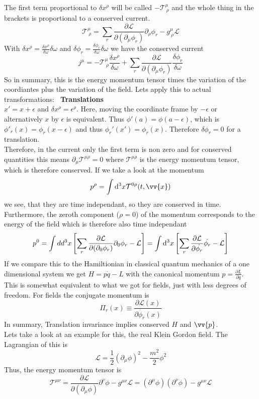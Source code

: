 \documentclass{include/thesisclass}
\newcommand{\LL}{\mathcal{L}}
\newcommand{\vx}{\vv{x}}
\newcommand{\vp}{\vv{p}}
\newcommand{\dd}{{\rm d}}
\newcommand{\p}{\partial}
\newcommand{\eps}{\epsilon}
\newcommand{\sub}[1]{~\newline\newline\textbf{#1}\\}
\begin{document}
The first term proportional to $\delta x^\rho$ will be called $- \mathcal{T}^\mu_{~\rho}$ and the whole thing in the brackets is proportional to a conserved current.
\[\mathcal{T}^\mu_{~\rho} = \sum_r \frac{\p \LL}{\p ( \p_\mu \phi_r)} \p_\rho \phi_r - g^\mu_{~\rho} \LL\]
With $\delta x^\rho = \frac{\delta x^\rho}{\delta \omega}\delta\omega$ and $\delta \phi_r = \frac{\delta \phi_r}{\delta \omega}{\delta \omega}$ we have the conserved current
\[j ^\mu = - \mathcal{T}^\mu_{~\rho} \frac{\delta x^\rho}{\delta \omega} + \sum_r \frac{\p \LL}{\p ( \p_\mu \phi_r)} \frac{\delta \phi_r}{\delta \omega}\]
So in summary, this is the energy momentum tensor times the variation of the coordiantes plus the variation of the field. Lets apply this to actual transformations:
\sub{Translations}
$x' = x + \eps$ and $\delta x^\rho = \eps ^\rho$. Here, moving the coordinate frame by $- \eps$ or alternatively $x$ by $\eps$ is equivalent. Thus $ \phi'(a) = \phi(a - \eps)$, which is $\phi'_r(x) = \phi_r(x - \eps)$ and thus $\phi_r'(x') = \phi_r(x)$. Therefore $\delta \phi_r = 0$ for a translation.\\
Therefore, in the current only the first term is non zero and for conserved quantities this means $\p_\mu \mathcal{T}^{\mu\rho} = 0$ where $\mathcal{T}^{\mu\rho}$ is the energy momentum tensor, which is therefore conserved. If we take a look at the momentum
\[ p ^\rho = \int \dd^3 x \mathcal{T}^{0\rho}(t, \vx)\]
we see, that they are time independant, so they are conserved in time. Furthermore, the zeroth component ($\rho = 0$) of the momentum corresponds to the energy of the field which is therefore also time independant
\[p^0 = \int dd^3 x \left[ \sum_r \frac{ \p \LL}{\p ( \p_0 \phi_r)} \p_0 \phi_r- \LL\right] = \int \dd ^3 x \left[ \sum_r \frac{\p \LL}{\p \dot{\phi_r}} \dot{\phi_r}-\LL\right]\]
If we compare this to the Hamiltionian in classical quantum mechanics of a one dimensional system we get $H = p \dot{q} - L$ with the canonical momentum $p = \frac{\p L}{\p \dot{q}}$. This is somewhat equivalent to what we got for fields, just with less degrees of freedom. For fields the conjugate momentum is
\[ \Pi_r(x) \equiv \frac{\p \LL(x)}{\p \dot{\phi_r}(x)}\]
In summary, Translation invariance implies conserved $H$ and $\vp$.
\\Lets take a look at an example for this, the real Klein Gordon field. The Lagrangian of this is 
\[\LL = \frac{1}{2} ( \p_\mu \phi)^2 - \frac{m^2}{2}\phi^2\]
Thus, the energy momentum tensor is
\[ \mathcal{T}^{\mu\nu} = \frac{\p\LL}{\p (\p_\mu \phi)} \p^\nu \phi - g^{\mu\nu} \LL = (\p ^\mu \phi)(\p^\nu \phi) - g^{\mu\nu} \LL\]
\end{document}
